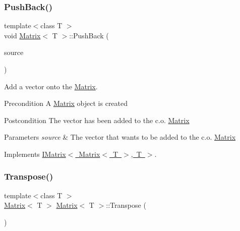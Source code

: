 \mbox{\label{class_matrix_af61aaa671b6bd354b27fb3aabbb65a9d}} 
\subsubsection{\texorpdfstring{PushBack()}{PushBack()}}
{\footnotesize\ttfamily template$<$class T $>$ \\
void \mbox{\hyperlink{class_matrix}{Matrix}}$<$ T $>$\+::Push\+Back (\begin{DoxyParamCaption}\item[{const \mbox{\hyperlink{class_my_vector}{My\+Vector}}$<$ T $>$ \&}]{source }\end{DoxyParamCaption})\hspace{0.3cm}{\ttfamily [virtual]}}



Add a vector onto the \mbox{\hyperlink{class_matrix}{Matrix}}. 

\begin{DoxyPrecond}{Precondition}
A \mbox{\hyperlink{class_matrix}{Matrix}} object is created 
\end{DoxyPrecond}
\begin{DoxyPostcond}{Postcondition}
The vector has been added to the c.\+o. \mbox{\hyperlink{class_matrix}{Matrix}}
\end{DoxyPostcond}

\begin{DoxyParams}{Parameters}
{\em source} & The vector that wants to be added to the c.\+o. \mbox{\hyperlink{class_matrix}{Matrix}} \\
\hline
\end{DoxyParams}


Implements \mbox{\hyperlink{class_i_matrix_aa5de147c7aa5b74b0f2177ed1a8158de}{I\+Matrix$<$ Matrix$<$ T $>$, T $>$}}.

\mbox{\label{class_matrix_a86d55a5db43b641f4e8fb2b302ccc599}} 
\subsubsection{\texorpdfstring{Transpose()}{Transpose()}}
{\footnotesize\ttfamily template$<$class T $>$ \\
\mbox{\hyperlink{class_matrix}{Matrix}}$<$ T $>$ \mbox{\hyperlink{class_matrix}{Matrix}}$<$ T $>$\+::Transpose (\begin{DoxyParamCaption}{ }\end{DoxyParamCaption})}



